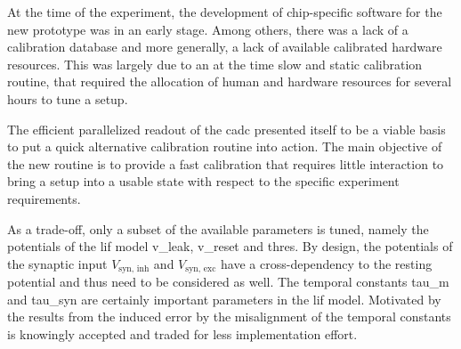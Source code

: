 At the time of the experiment, the development of chip-specific software for the new prototype was in an early stage. Among others, there was a lack of a calibration database and more generally, a lack of available calibrated hardware resources. This was largely due to an at the time slow and static calibration routine, that required the allocation of human and hardware resources for several hours to tune a setup.

The efficient parallelized readout of the \gls{cadc} presented itself to be a viable basis to put a quick alternative calibration routine into action. The main objective of the new routine is to provide a fast calibration that requires little interaction to bring a setup into a usable state with respect to the specific experiment requirements. 

As a trade-off, only a subset of the available parameters is tuned, namely the potentials of the \gls{lif} model \gls{v_leak}, \gls{v_reset} and \gls{thres}. By design, the potentials of the synaptic input $V_\text{syn, inh}$ and $V_\text{syn, exc}$ have a cross-dependency to the resting potential and thus need to be considered as well. The temporal constants \gls{tau_m} and \gls{tau_syn} are certainly important parameters in the \gls{lif} model. Motivated by the results from \citealp{wunderlich2019advantages} the induced error by the misalignment of the temporal constants is knowingly accepted and traded for less implementation effort.

